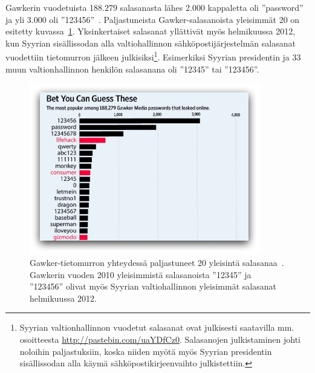 \documentclass[finnish,gradu]{tktltiki}
\begin{document}
   Gawkerin vuodetuista 188.279 salasanasta lähes 2.000 kappaletta oli ''password'' ja yli 3.000 oli  ''123456''~\cite{forbes_gawker_12_2010}. Paljastuneista Gawker-salasanoista yleisimmät 20 on esitetty kuvassa~\ref{fig:gawker_top20_passwords}. Yksinkertaiset salasanat yllättivät myös helmikuussa 2012, kun Syyrian sisällissodan alla valtiohallinnon sähköpostijärjestelmän salasanat vuodettiin tietomurron jälkeen julkisiksi\footnote{Syyrian valtionhallinnon vuodetut salasanat ovat julkisesti saatavilla mm. osoitteesta \url{http://pastebin.com/uaYDfCz0}. Salasanojen julkistaminen johti noloihin paljastuksiin, koska niiden myötä myös Syyrian presidentin sisällissodan alla käymä sähköpostikirjeenvaihto julkistettiin.}. Esimerkiksi Syyrian presidentin ja 33 muun valtionhallinnon henkilön salasanana oli ''12345'' tai ''123456''.

  \begin{figure}
    \centering
    \includegraphics[width=0.9\textwidth]{images/gawker_top20_passwords.jpg}
    \caption{Gawker-tietomurron yhteydessä paljastuneet 20 yleisintä salasanaa~\cite{wsj_gawker_12_2010}. Gawkerin vuoden 2010 yleisimmistä salasanoista ''12345'' ja ''123456'' olivat myös Syyrian valtiohallinnon yleisimmät salasanat helmikuussa 2012.}
    \label{fig:gawker_top20_passwords}
  \end{figure}
\end{document}
